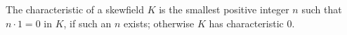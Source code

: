 The characteristic of a skewfield $K$ is the smallest positive integer $n$ such that $n \cdot 1 = 0$ in $K$, if such an $n$ exists; otherwise $K$ has characteristic $0$.
